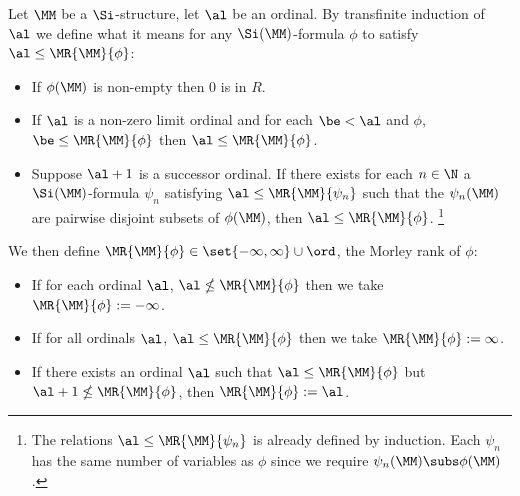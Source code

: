 \begin{dfn}
    Let $\MM$ be a $\Si$-structure, 
    let $\al$ be an ordinal.
    By transfinite induction of $\al$
    we define what it means for any $\Si(\MM)$-formula $\phi$ to satisfy 
    $\al \leq \MR{\MM}{\phi}$:
    \begin{itemize}
        \item If $\phi(\MM)$ is non-empty then $0$ is in $R$.
        \item If $\al$ is a non-zero limit ordinal and for each $\be < \al$
            and $\phi$, 
            $\be \leq \MR{\MM}{\phi}$ then $\al \leq \MR{\MM}{\phi}$.
        \item Suppose $\al + 1$ is a successor ordinal. 
            If there exists for each 
            $n \in \N$ a $\Si(\MM)$-formula $\psi_n$ satisfying 
            $\al \leq \MR{\MM}{\psi_n}$ such that the $\psi_n(\MM)$
            are pairwise disjoint subsets of $\phi(\MM)$, 
            then $\al \leq \MR{\MM}{\phi}$.
            \footnote{The relations $\al \leq \MR{\MM}{\psi_n}$ 
            is already defined by induction.
            Each $\psi_n$ has the same number of variables as $\phi$
            since we require $\psi_n(\MM) \subs \phi(\MM)$.}
    \end{itemize}

    We then define $\MR{\MM}{\phi} \in \set{-\infty,\infty} \cup \ord$, 
    the Morley rank of $\phi$:
    \begin{itemize}
        \item If for each ordinal $\al$, 
            $\al \nleq \MR{\MM}{\phi}$ then we take 
            $\MR{\MM}{\phi} := -\infty$.
        \item If for all ordinals $\al$, 
            $\al \leq \MR{\MM}{\phi}$ then we take $\MR{\MM}{\phi} := \infty$.
        \item If there exists an ordinal $\al$ 
            such that $\al \leq \MR{\MM}{\phi}$ but 
            $\al + 1 \nleq \MR{\MM}{\phi}$, 
            then $\MR{\MM}{\phi} := \al$.
    \end{itemize}
\end{dfn}
